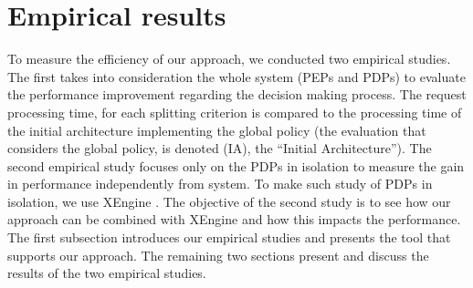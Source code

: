 \section{Empirical results} \label{sec:experiment}
To measure the efficiency of our approach, we conducted two empirical studies. The first takes into consideration the whole system 
(PEPs and PDPs) to evaluate the performance improvement regarding the decision making process. The request processing time, 
for each splitting criterion is compared to the processing time of the initial architecture implementing the global policy (the evaluation 
that considers the global policy, is denoted (IA), the ``Initial Architecture''). The second empirical study focuses only on the PDPs in isolation to measure the gain in performance
 independently from system. To make such study of PDPs in isolation, we use XEngine \cite{Xengine}. The objective of the second study is to see how our approach can be 
combined with XEngine and how this impacts the performance. The first subsection introduces our empirical studies and presents the tool that supports our approach. The remaining two 
sections present and discuss the results of the two empirical studies.  


